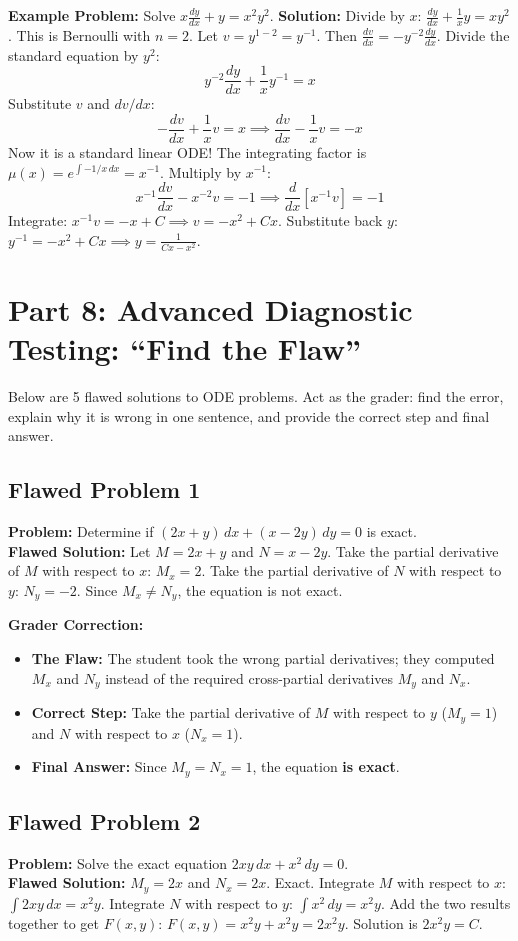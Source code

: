 \documentclass[11pt]{article}
\begin{document}
\textbf{Example Problem:} Solve $x\frac{dy}{dx} + y = x^2y^2$. 
\textbf{Solution:} Divide by $x$: $\frac{dy}{dx} + \frac{1}{x}y = xy^2$. This is Bernoulli with $n = 2$. Let $v = y^{1-2} = y^{-1}$. Then $\frac{dv}{dx} = -y^{-2}\frac{dy}{dx}$. Divide the standard equation by $y^2$:
\[ y^{-2}\frac{dy}{dx} + \frac{1}{x}y^{-1} = x \]
Substitute $v$ and $dv/dx$:
\[ -\frac{dv}{dx} + \frac{1}{x}v = x \implies \frac{dv}{dx} - \frac{1}{x}v = -x \]
Now it is a standard linear ODE! The integrating factor is $\mu(x) = e^{\int -1/x \, dx} = x^{-1}$. Multiply by $x^{-1}$:
\[ x^{-1}\frac{dv}{dx} - x^{-2}v = -1 \implies \frac{d}{dx}[x^{-1}v] = -1 \]
Integrate: $x^{-1}v = -x + C \implies v = -x^2 + Cx$. Substitute back $y$: $y^{-1} = -x^2 + Cx \implies y = \frac{1}{Cx - x^2}$.

\newpage
\section*{Part 8: Advanced Diagnostic Testing: ``Find the Flaw''}

Below are 5 flawed solutions to ODE problems. Act as the grader: find the error, explain why it is wrong in one sentence, and provide the correct step and final answer.

\subsection*{Flawed Problem 1}
\textbf{Problem:} Determine if $(2x + y) \, dx + (x - 2y) \, dy = 0$ is exact.
\\
\textbf{Flawed Solution:} Let $M = 2x + y$ and $N = x - 2y$. Take the partial derivative of $M$ with respect to $x$: $M_x = 2$. Take the partial derivative of $N$ with respect to $y$: $N_y = -2$. Since $M_x \neq N_y$, the equation is not exact.

\textbf{Grader Correction:}
\begin{itemize}
    \item \textbf{The Flaw:} The student took the wrong partial derivatives; they computed $M_x$ and $N_y$ instead of the required cross-partial derivatives $M_y$ and $N_x$.
    \item \textbf{Correct Step:} Take the partial derivative of $M$ with respect to $y$ ($M_y = 1$) and $N$ with respect to $x$ ($N_x = 1$). 
    \item \textbf{Final Answer:} Since $M_y = N_x = 1$, the equation \textbf{is exact}.
\end{itemize}

\subsection*{Flawed Problem 2}
\textbf{Problem:} Solve the exact equation $2xy \, dx + x^2 \, dy = 0$.
\\
\textbf{Flawed Solution:} $M_y = 2x$ and $N_x = 2x$. Exact. Integrate $M$ with respect to $x$: $\int 2xy \, dx = x^2y$. Integrate $N$ with respect to $y$: $\int x^2 \, dy = x^2y$. Add the two results together to get $F(x, y)$: $F(x, y) = x^2y + x^2y = 2x^2y$. Solution is $2x^2y = C$.
\end{document}
